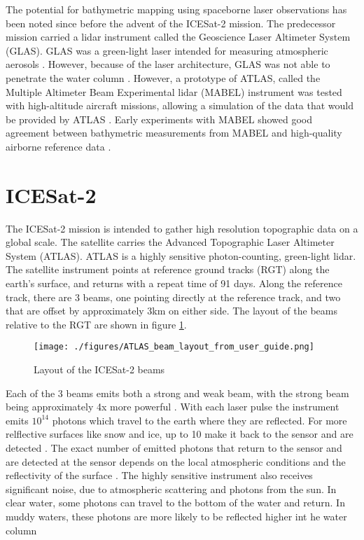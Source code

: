 The potential for bathymetric mapping using spaceborne laser observations has been noted since before the advent of the ICESat-2 mission. The predecessor mission carried a lidar instrument called the Geoscience Laser Altimeter System (GLAS). GLAS was a green-light laser intended for measuring atmospheric aerosols \parencite{Abshire2005}. However, because of the laser architecture, GLAS was not able to penetrate the water column \parencite{Forfinski-Sarkozi2016}. However, a prototype of ATLAS, called the Multiple Altimeter Beam Experimental lidar (MABEL) instrument was tested with high-altitude aircraft missions, allowing a simulation of the data that would be provided by ATLAS \parencite{Mcgill2013}. Early experiments with MABEL showed good agreement between bathymetric measurements from MABEL and high-quality airborne reference data \parencite{Jasinski2016,Forfinski-Sarkozi2016}.


\section{ICESat-2}

The ICESat-2 mission is intended to gather high resolution topographic data on a global scale. The satellite carries the Advanced Topographic Laser Altimeter System (ATLAS). ATLAS is a highly sensitive photon-counting, green-light lidar. The satellite instrument points at reference ground tracks (RGT) along the earth's surface, and returns with a repeat time of 91 days. Along the reference track, there are 3 beams, one pointing directly at the reference track, and two that are offset by approximately 3km on either side. The layout of the beams relative to the RGT are shown in figure \ref{fig:icesat-rgts}.

\begin{figure}[h!]
      \centering
      \texttt{[image: ./figures/ATLAS\_beam\_layout\_from\_user\_guide.png]}
      \caption{Layout of the ICESat-2 beams}
      \label{fig:icesat-rgts}
\end{figure}

Each of the 3 beams emits both a strong and weak beam, with the strong beam being approximately 4x more powerful \parencite{Neumann2019d}. With each laser pulse the instrument emits \(10^{14}\) photons which travel to the earth where they are reflected. For more relflective surfaces like snow and ice, up to 10 make it back to the sensor and are detected \parencite{Neumann2019d}. The exact number of emitted photons that return to the sensor and are detected at the sensor depends on the local atmospheric conditions and the reflectivity of the surface \parencite{Neumann2019e}. The highly sensitive instrument also receives significant noise, due to atmospheric scattering and photons from the sun. In clear water, some photons can travel to the bottom of the water and return. In muddy waters, these photons are more likely to be reflected higher int he water column \parencite{Ranndal2021}

